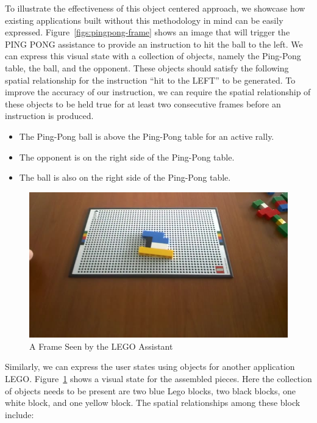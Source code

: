 To illustrate the effectiveness of this object centered approach, we showcase
how existing applications built without this methodology in mind can be easily
expressed. Figure~\ref{figs:pingpong-frame} shows an image that will trigger the
PING PONG assistance to provide an instruction to hit the ball to the left. We
can express this visual state with a collection of objects, namely the Ping-Pong
table, the ball, and the opponent. These objects should satisfy the following
spatial relationship for the instruction ``hit to the LEFT'' to be generated. To
improve the accuracy of our instruction, we can require the spatial relationship
of these objects to be held true for at least two consecutive frames before an
instruction is produced.

\begin{itemize}
  \item The Ping-Pong ball is above the Ping-Pong table for an active rally.
  \item The opponent is on the right side of the Ping-Pong table.
  \item The ball is also on the right side of the Ping-Pong table.
\end{itemize}

\begin{figure}
  \centering
  \includegraphics[trim={0 0 0 0},width=.9\linewidth]{FIGS/lego}
	\caption{A Frame Seen by the LEGO Assistant}
    \label{fig:lego-image}
\end{figure}

Similarly, we can express the user states using objects for another
application LEGO. Figure~\ref{fig:lego-image} shows a visual state for the
assembled pieces. Here the collection of objects needs to be present are two
blue Lego blocks, two black blocks, one white block, and one yellow block. The
spatial relationships among these block include:

